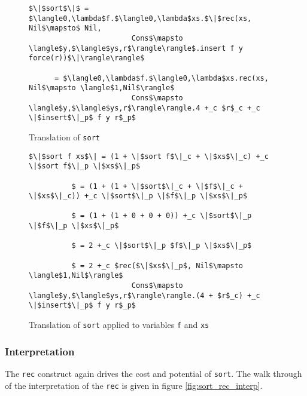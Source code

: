 \documentclass[12pt,letterpaper]{article}
\newcommand{\T}[1]{\texttt{#1}}
\begin{document}
\begin{figure}[H]
\caption{Translation of \T{sort}}
\label{fig:sort}
\begin{lstlisting}
$\|$sort$\|$ = $\langle0,\lambda$f.$\langle0,\lambda$xs.$\|$rec(xs, Nil$\mapsto$ Nil,
                        Cons$\mapsto \langle$y,$\langle$ys,r$\rangle\rangle$.insert f y force(r))$\|\rangle\rangle$

      = $\langle0,\lambda$f.$\langle0,\lambda$xs.rec(xs, Nil$\mapsto \langle$1,Nil$\rangle$
                        Cons$\mapsto \langle$y,$\langle$ys,r$\rangle\rangle.4 +_c $r$_c +_c \|$insert$\|_p$ f y r$_p$
\end{lstlisting}
\end{figure}

\begin{figure}[H]
  \caption{Translation of \T{sort} applied to variables \T{f} and \T{xs}}
\label{fig:sort_applied}
\begin{lstlisting}
$\|$sort f xs$\| = (1 + \|$sort f$\|_c + \|$xs$\|_c) +_c \|$sort f$\|_p \|$xs$\|_p$

          $ = (1 + (1 + \|$sort$\|_c + \|$f$\|_c + \|$xs$\|_c)) +_c \|$sort$\|_p \|$f$\|_p \|$xs$\|_p$

          $ = (1 + (1 + 0 + 0 + 0)) +_c \|$sort$\|_p \|$f$\|_p \|$xs$\|_p$

          $ = 2 +_c \|$sort$\|_p $f$\|_p \|$xs$\|_p$

          $ = 2 +_c $rec($\|$xs$\|_p$, Nil$\mapsto \langle$1,Nil$\rangle$
                        Cons$\mapsto \langle$y,$\langle$ys,r$\rangle\rangle.(4 + $r$_c) +_c \|$insert$\|_p$ f y r$_p$
\end{lstlisting}
\end{figure}


\subsubsection{Interpretation}
The \T{rec} construct again drives the cost and potential of \T{sort}.
The walk through of the interpretation of the \T{rec} is given in figure \ref{fig:sort_rec_interp}.
\end{document}
